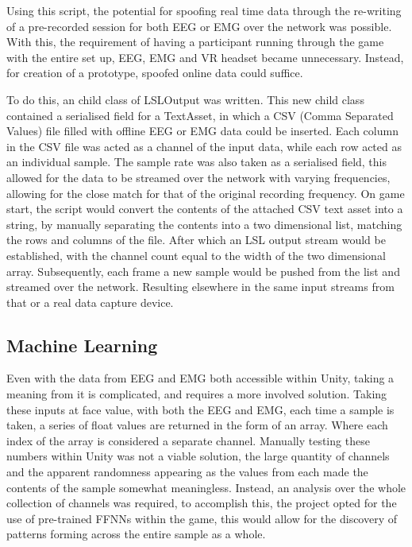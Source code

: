 \documentclass[11pt, a4paper]{article}
\begin{document}
\pagebreak

Using this script, the potential for spoofing real time data through the re-writing of a pre-recorded session for both EEG or EMG over the network was possible. With this, the requirement of having a participant running through the game with the entire set up, EEG, EMG and VR headset became unnecessary. Instead, for creation of a prototype, spoofed online data could suffice.

\hfill

To do this, an child class of LSLOutput was written. This new child class contained a serialised field for a TextAsset, in which a CSV (Comma Separated Values) file filled with offline EEG or EMG data could be inserted. Each column in the CSV file was acted as a channel of the input data, while each row acted as an individual sample. The sample rate was also taken as a serialised field, this allowed for the data to be streamed over the network with varying frequencies, allowing for the close match for that of the original recording frequency. On game start, the script would convert the contents of the attached CSV text asset into a string, by manually separating the contents into a two dimensional list, matching the rows and columns of the file. After which an LSL output stream would be established, with the channel count equal to the width of the two dimensional array. Subsequently, each frame a new sample would be pushed from the list and streamed over the network. Resulting elsewhere in the same input streams from that or a real data capture device.   




\pagebreak
\subsection{Machine Learning}
	
Even with the data from EEG and EMG both accessible within Unity, taking a meaning from it is complicated, and requires a more involved solution. Taking these inputs at face value, with both the EEG and EMG, each time a sample is taken, a series of float values are returned in the form of an array. Where each index of the array is considered a separate channel. Manually testing these numbers within Unity was not a viable solution, the large quantity of channels and the apparent randomness appearing as the values from each made the contents of the sample somewhat meaningless. Instead, an analysis over the whole collection of channels was required, to accomplish this, the project opted for the use of pre-trained FFNNs within the game, this would allow for the discovery of patterns forming across the entire sample as a whole. 
\end{document}
